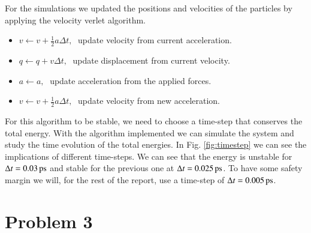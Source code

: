 For the simulations we updated the positions and velocities of the particles by applying the velocity verlet algorithm.

\begin{itemize}
\item $v \leftarrow v +\frac{1}{2}a\Delta t, \;$ update velocity from current acceleration.
\item $q \leftarrow q +v\Delta t, \;$ update displacement from current velocity.
\item $a \leftarrow a, \;$ update acceleration from the applied forces.
\item $v \leftarrow v +\frac{1}{2}a\Delta t, \;$ update velocity from new acceleration.
\end{itemize}

For this algorithm to be stable, we need to choose a time-step that conserves the total energy. With the algorithm implemented we can simulate the system and study the time evolution of the total energies. In Fig. \ref{fig:timestep} we can see the implications of different time-steps. We can see that the energy is unstable for $\Delta t = \unit[0.03]{ps}$ and stable for the previous one at $\Delta t = \unit[0.025]{ps}$. To have some safety margin we will, for the rest of the report, use a time-step of $\Delta t = \unit[0.005]{ps}$.

\section*{Problem 3}

